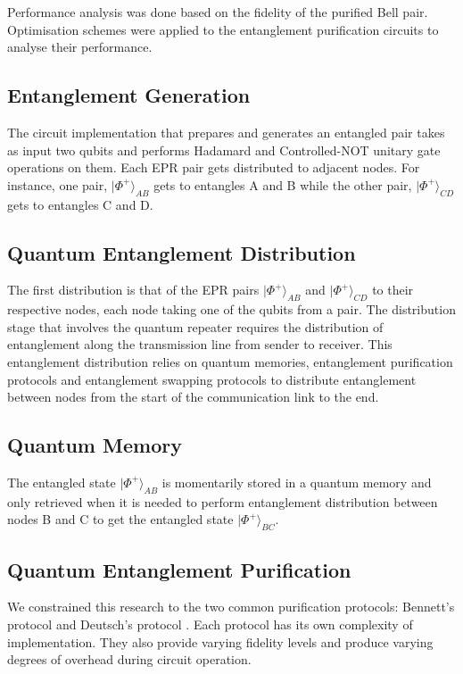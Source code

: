 \documentclass[11pt]{article}
\begin{document}
Performance analysis was done based on the fidelity of the purified Bell pair. Optimisation schemes were applied to the entanglement purification circuits to analyse their performance.

\subsection{Entanglement Generation}
The circuit implementation that prepares and generates an entangled pair takes as input two qubits and performs Hadamard and Controlled-NOT unitary gate operations on them. Each EPR pair gets distributed to adjacent nodes. For instance, one pair, $|\Phi^{+}\rangle_{AB}$ gets to entangles A and B while the other pair, $|\Phi^{+}\rangle_{CD}$ gets to entangles C and D.

\subsection{Quantum Entanglement Distribution}
The first distribution is that of the EPR pairs $|\Phi^{+}\rangle_{AB}$ and $|\Phi^{+}\rangle_{CD}$ to their respective nodes, each node taking one of the qubits from a pair. The distribution stage that involves the quantum repeater requires the distribution of entanglement along the transmission line from sender to receiver. This entanglement distribution relies on quantum memories, entanglement purification protocols and entanglement swapping protocols to distribute entanglement between nodes from the start of the communication link to the end.

\subsection{Quantum Memory}
The entangled state $|\Phi^{+}\rangle_{AB}$ is momentarily stored in a quantum memory and only retrieved when it is needed to perform entanglement distribution between nodes B and C to get the entangled state $|\Phi^{+}\rangle_{BC}$.

\subsection{Quantum Entanglement Purification}
We constrained this research to the two common purification protocols: Bennett's protocol \cite{Bennett_1996} and Deutsch's protocol \cite{Deutsch_1996}. Each protocol has its own complexity of implementation. They also provide varying fidelity levels and produce varying degrees of overhead during circuit operation.
\end{document}
